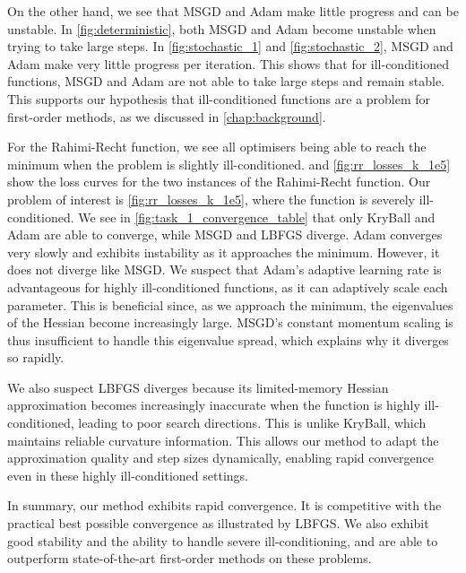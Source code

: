 On the other hand, we see that MSGD and Adam make little progress and can be unstable. In \cref{fig:deterministic}, both MSGD and Adam become unstable when trying to take large steps. In \cref{fig:stochastic_1} and \cref{fig:stochastic_2}, MSGD and Adam make very little progress per iteration. This shows that for ill-conditioned functions, MSGD and Adam are not able to take large steps and remain stable. This supports our hypothesis that ill-conditioned functions are a problem for first-order methods, as we discussed in \cref{chap:background}.

For the Rahimi-Recht function, we see all optimisers being able to reach the minimum when the problem is slightly ill-conditioned.  and \cref{fig:rr_losses_k_1e5} show the loss curves for the two instances of the Rahimi-Recht function. Our problem of interest is \cref{fig:rr_losses_k_1e5}, where the function is severely ill-conditioned. We see in \cref{fig:task_1_convergence_table} that only KryBall and Adam are able to converge, while MSGD and LBFGS diverge. Adam converges very slowly and exhibits instability as it approaches the minimum. However, it does not diverge like MSGD. We suspect that Adam's adaptive learning rate is advantageous for highly ill-conditioned functions, as it can adaptively scale each parameter. This is beneficial since, as we approach the minimum, the eigenvalues of the Hessian become increasingly large. MSGD's constant momentum scaling is thus insufficient to handle this eigenvalue spread, which explains why it diverges so rapidly.

We also suspect LBFGS diverges because its limited-memory Hessian approximation becomes increasingly inaccurate when the function is highly ill-conditioned, leading to poor search directions. This is unlike KryBall, which maintains reliable curvature information. This allows our method to adapt the approximation quality and step sizes dynamically, enabling rapid convergence even in these highly ill-conditioned settings.

In summary, our method exhibits rapid convergence. It is competitive with the practical best possible convergence as illustrated by LBFGS. We also exhibit good stability and the ability to handle severe ill-conditioning, and are able to outperform state-of-the-art first-order methods on these problems.

